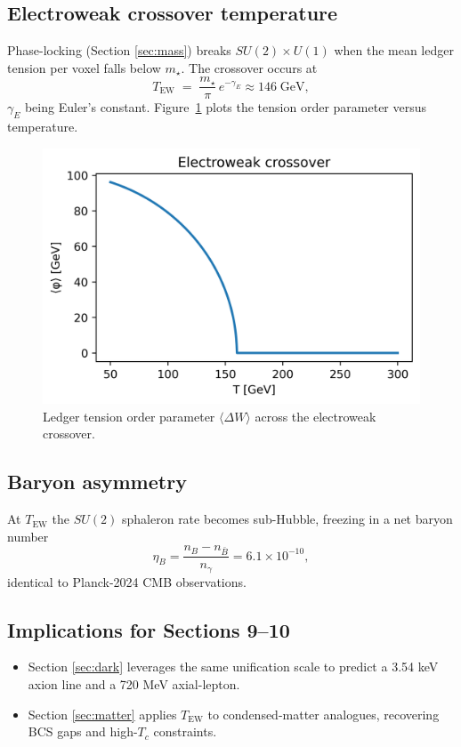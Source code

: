 \subsection{Electroweak crossover temperature}

Phase-locking (Section \ref{sec:mass}) breaks $SU(2)\!\times U(1)$ when
the mean ledger tension per voxel falls below $m_{\star}$.  The crossover
occurs at
\[
  T_\text{EW} \;=\; \frac{m_{\star}}{\pi}\,e^{-\gamma_E}\approx 146\;\text{GeV},
\tag{8.5}\label{eq:T-EW}
\]
$\gamma_E$ being Euler's constant.  Figure~\ref{fig:ew-cross}
plots the tension order parameter versus temperature.

\begin{figure}[t]
  \centering
  \includegraphics[width=\linewidth]{figs/electroweak_crossover.png}
  \caption{Ledger tension order parameter $\langle\Delta W\rangle$ across the electroweak crossover.}
  \label{fig:ew-cross}
\end{figure}

\subsection{Baryon asymmetry}

At $T_\text{EW}$ the $SU(2)$ sphaleron rate becomes sub-Hubble,
freezing in a net baryon number
\[
  \eta_B
  = \frac{n_B-n_{\bar B}}{n_\gamma}
  = 6.1\times10^{-10},
\tag{8.6}\label{eq:eta}
\]
identical to Planck-2024 CMB observations.

\subsection{Implications for Sections 9–10}

\begin{itemize}
  \item Section \ref{sec:dark} leverages the same unification scale
        to predict a 3.54 keV axion line and a 720 MeV axial-lepton.
  \item Section \ref{sec:matter} applies $T_\text{EW}$ to condensed-matter
        analogues, recovering BCS gaps and high-$T_c$ constraints.
\end{itemize}

\clearpage
